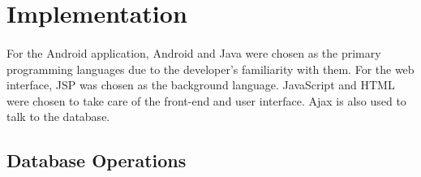\section{Implementation}												
\label{sec:Implementation}

\paragraph{}For the Android application, Android and Java were chosen as the primary programming languages due to the developer's familiarity with them. For the web interface, JSP was chosen as the background language. JavaScript and HTML were chosen to take care of the front-end and user interface. Ajax is also used to talk to the database. 

\subsection{Database Operations}
\label{subsec:DatabaseOperations}
